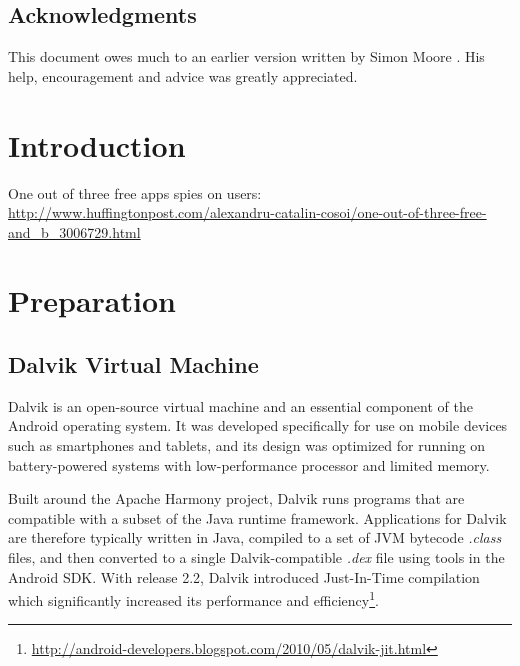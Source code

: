 \documentclass[12pt,twoside,notitlepage]{report}
\begin{document}
\newpage
\section*{Acknowledgments}

This document owes much to an earlier version written by Simon Moore
\cite{moore95}.  His help, encouragement and advice was greatly 
appreciated.


\cleardoublepage        %

\setcounter{page}{1}
\pagestyle{headings}

\chapter{Introduction}

One out of three free apps spies on users: \url{http://www.huffingtonpost.com/alexandru-catalin-cosoi/one-out-of-three-free-and_b_3006729.html}

\cleardoublepage
\chapter{Preparation}

\section{Dalvik Virtual Machine}

Dalvik is an open-source virtual machine and an essential component of the Android operating system. It was developed specifically for use on mobile devices such as smartphones and tablets, and its design was optimized for running on battery-powered systems with low-performance processor and limited memory. 

Built around the Apache Harmony project, Dalvik runs programs that are compatible with a subset of the Java runtime framework. Applications for Dalvik are therefore typically written in Java, compiled to a set of JVM bytecode \emph{.class} files, and then converted to a single Dalvik-compatible \emph{.dex} file using tools in the Android SDK. With release 2.2, Dalvik introduced Just-In-Time compilation which significantly increased its performance and efficiency\footnote{\scriptsize\url{http://android-developers.blogspot.com/2010/05/dalvik-jit.html}}.
\end{document}
